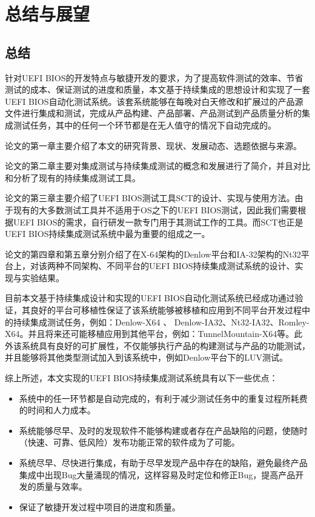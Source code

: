 \chapter{总结与展望}
\label{cha:intro}

\section{总结}

	针对UEFI BIOS的开发特点与敏捷开发的要求，为了提高软件测试的效率、节省测试的成本、保证测试的进度和质量，本文基于持续集成的思想设计和实现了一套UEFI BIOS自动化测试系统。该套系统能够在每晚对白天修改和扩展过的产品源文件进行集成和测试，完成从产品构建、产品部署、产品测试到产品质量分析的集成测试任务，其中的任何一个环节都是在无人值守的情况下自动完成的。
	
	论文的第一章主要介绍了本文的研究背景、现状、发展动态、选题依据与来源。
	
	论文的第二章主要对集成测试与持续集成测试的概念和发展进行了简介，并且对比和分析了现有的持续集成测试工具。
	
	论文的第三章主要介绍了UEFI BIOS测试工具SCT的设计、实现与使用方法。由于现有的大多数测试工具并不适用于OS之下的UEFI BIOS测试，因此我们需要根据UEFI BIOS的需求，自行研发一款专门用于其测试工作的工具。而SCT也正是UEFI BIOS持续集成测试系统中最为重要的组成之一。
	
	论文的第四章和第五章分别介绍了在X-64架构的Denlow平台和IA-32架构的Nt32平台上，对该两种不同架构、不同平台的UEFI BIOS持续集成测试系统的设计、实现与实验结果。 
	
	目前本文基于持续集成设计和实现的UEFI BIOS自动化测试系统已经成功通过验证，其良好的平台可移植性保证了该系统能够被移植和应用到不同平台开发过程中的持续集成测试任务，例如：Denlow-X64 、 Denlow-IA32、Nt32-IA32、Romley-X64。并且将来还可能移植应用到其他平台，例如：TunnelMountain-X64等。此外该系统具有良好的可扩展性，不仅能够执行产品的构建测试与产品的功能测试，并且能够将其他类型测试加入到该系统中，例如Denlow平台下的LUV测试。
	
	综上所述，本文实现的UEFI BIOS持续集成测试系统具有以下一些优点：
	
	\begin{itemize}
		\item 系统中的任一环节都是自动完成的，有利于减少测试任务中的重复过程所耗费的时间和人力成本。
		\item 系统能够尽早、及时的发现软件不能够构建或者存在产品缺陷的问题，使随时（快速、可靠、低风险）发布功能正常的软件成为了可能。
		\item 系统尽早、尽快进行集成，有助于尽早发现产品中存在的缺陷，避免最终产品集成中出现Bug大量涌现的情况，这样容易及时定位和修正Bug，提高产品开发的质量与效率。
		\item 保证了敏捷开发过程中项目的进度和质量。
	\end{itemize}

